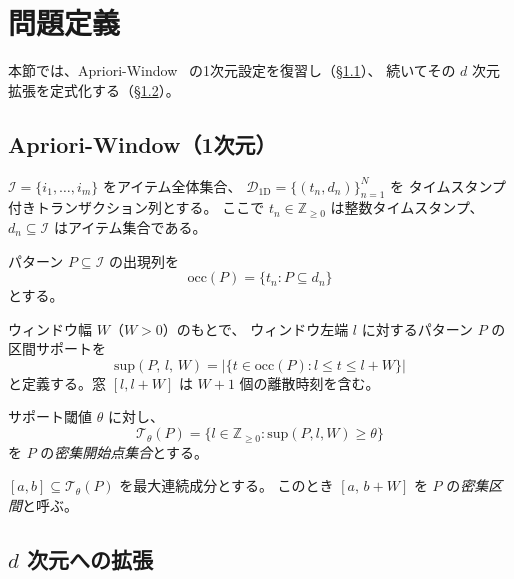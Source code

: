 \section{問題定義}\label{sec:problem}

本節では、Apriori-Window~\cite{aprioriwindow} の1次元設定を復習し（\S\ref{sec:1d_review}）、
続いてその $d$ 次元拡張を定式化する（\S\ref{sec:nd_extension}）。

\subsection{Apriori-Window（1次元）}\label{sec:1d_review}

$\mathcal{I} = \{i_1, \ldots, i_m\}$ をアイテム全体集合、
$\mathcal{D}_{\mathrm{1D}} = \{(t_n, d_n)\}_{n=1}^N$ を
タイムスタンプ付きトランザクション列とする。
ここで $t_n \in \mathbb{Z}_{\geq 0}$ は整数タイムスタンプ、
$d_n \subseteq \mathcal{I}$ はアイテム集合である。

パターン $P \subseteq \mathcal{I}$ の出現列を
\[
  \mathrm{occ}(P) = \{t_n : P \subseteq d_n\}
\]
とする。

\begin{definition}\label{def:sup1d}
ウィンドウ幅 $W$（$W > 0$）のもとで、
ウィンドウ左端 $l$ に対するパターン $P$ の区間サポートを
\[
  \mathrm{sup}(P,\, l,\, W)
  = \bigl|\{t \in \mathrm{occ}(P) : l \leq t \leq l + W\}\bigr|
\]
と定義する。窓 $[l, l+W]$ は $W+1$ 個の離散時刻を含む。
\end{definition}

\begin{definition}[密集開始点集合と密集区間]\label{def:dense1d}
サポート閾値 $\theta$ に対し、
\[
  \mathcal{T}_\theta(P)
  = \{l \in \mathbb{Z}_{\geq 0} : \mathrm{sup}(P, l, W) \geq \theta\}
\]
を $P$ の\emph{密集開始点集合}とする。

$[a,b] \subseteq \mathcal{T}_\theta(P)$ を最大連続成分とする。
このとき $[a,\, b + W]$ を $P$ の\emph{密集区間}と呼ぶ。
\end{definition}


\subsection{$d$ 次元への拡張}\label{sec:nd_extension}

